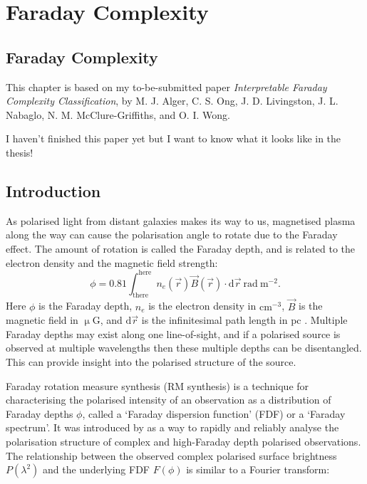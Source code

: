 \chapter{Faraday Complexity}
\label{cha:faraday}

\section{Faraday Complexity}
\label{sec:faraday-complexity}

This chapter is based on my to-be-submitted paper \emph{Interpretable Faraday Complexity Classification}, by M. J. Alger, C. S. Ong, J. D. Livingston, J. L. Nabaglo, N. M. McClure-Griffiths, and O. I. Wong.

I haven't finished this paper yet but I want to know what it looks like in the thesis!

\section{Introduction}
\label{sec:intro}

  As polarised light from distant galaxies makes its way to us, magnetised plasma along the way can cause the polarisation angle to rotate due to the Faraday effect. The amount of rotation is called the Faraday depth, and is related to the electron density and the magnetic field strength:
  \begin{equation}
      \phi = 0.81 \int_{\mathrm{there}}^{\mathrm{here}} n_e(\vec r) \vec B(\vec r) \cdot \mathrm{d}\vec{r}\ \mathrm{rad}\ \mathrm{m}^{-2}.
  \end{equation}
  Here $\phi$ is the Faraday depth, $n_e$ is the electron density in $\mathrm{cm}^{-3}$, $\vec B$ is the magnetic field in $\upmu$G, and $\mathrm{d}\vec r$ is the infinitesimal path length in pc \citep{brentjens_faraday_2005}. Multiple Faraday depths may exist along one line-of-sight, and if a polarised source is observed at multiple wavelengths then these multiple depths can be disentangled. This can provide insight into the polarised structure of the source.

  Faraday rotation measure synthesis (RM synthesis) is a technique for characterising the polarised intensity of an observation as a distribution of Faraday depths $\phi$, called a `Faraday dispersion function' (FDF) or a `Faraday spectrum'. It was introduced by \citet{brentjens_faraday_2005} as a way to rapidly and reliably analyse the polarisation structure of complex and high-Faraday depth polarised observations. The relationship between the observed complex polarised surface brightness $P(\lambda^2)$ and the underlying FDF $F(\phi)$ is similar to a Fourier transform:

